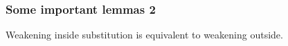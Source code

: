 \documentclass[12pt, mathserif,handout]{beamer}
\begin{document}
\begin{frame}

\frametitle{Some important lemmas 2}

Weakening inside substitution is equivalent to weakening outside.

\begin{code}\>\<%
\\
\> \AgdaSymbol{:} \AgdaSymbol{\{}  \AgdaSymbol{:} \AgdaSymbol{\}}\<%
\\
\>[0]\<[8]%
\>[8]\AgdaSymbol{\{} \AgdaSymbol{:}  \AgdaSymbol{\}\{} \AgdaSymbol{:}   \AgdaSymbol{\}}\<%
\\
\>[0]\<[8]%
\>[8]\AgdaSymbol{\{} \AgdaSymbol{:}  \AgdaSymbol{\}} \<[19]%
\>[19]\<%
\\
\>[0]\<[8]%
\>[8]  \AgdaFunction{[}    \AgdaFunction{]T}  \AgdaSymbol{(} \AgdaFunction{[}  \AgdaFunction{]T}\AgdaSymbol{)}   \<[42]%
\>[42]\<%
\\
%
\\
\> \AgdaSymbol{:} \AgdaSymbol{\{}  \AgdaSymbol{:} \AgdaSymbol{\}\{} \AgdaSymbol{:}  \AgdaSymbol{\}}\<%
\\
\>[8]\<[9]%
\>[9]\AgdaSymbol{(} \AgdaSymbol{:}  \AgdaSymbol{)\{} \AgdaSymbol{:}   \AgdaSymbol{\}}\<%
\\
\>[8]\<[9]%
\>[9]\AgdaSymbol{\{} \AgdaSymbol{:}  \AgdaSymbol{\}}\<%
\\
\>[8]\<[9]%
\>[9]  \AgdaFunction{[}    \AgdaFunction{]tm}  \AgdaSymbol{(} \AgdaFunction{[}  \AgdaFunction{]tm}\AgdaSymbol{)}  \<%
\\
\>\<\end{code}


\end{frame}
\end{document}
